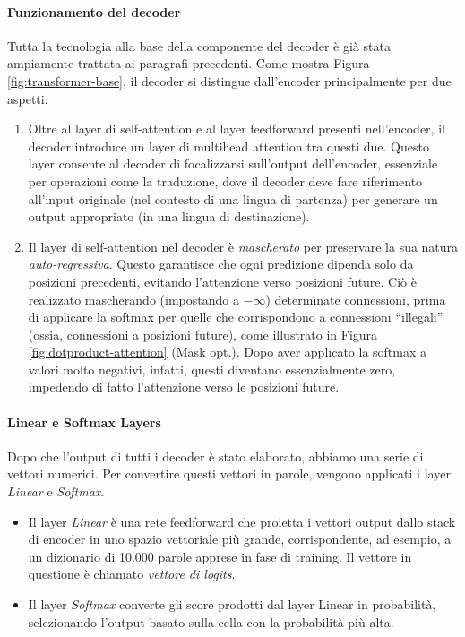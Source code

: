 \documentclass[12pt,a4paper,twoside,openright]{book}
\begin{document}
\paragraph{Funzionamento del decoder}
Tutta la tecnologia alla base della componente del decoder è già stata ampiamente trattata ai paragrafi precedenti. 
Come mostra Figura \ref{fig:transformer-base}, il decoder si distingue dall'encoder principalmente per due aspetti:
\begin{enumerate}
    \item Oltre al layer di self-attention e al layer feedforward presenti nell'encoder, il decoder introduce un layer di multihead attention tra questi due. Questo layer consente al decoder di focalizzarsi sull'output dell'encoder, essenziale per operazioni come la traduzione, dove il decoder deve fare riferimento all'input originale (nel contesto di una lingua di partenza) per generare un output appropriato (in una lingua di destinazione).
    
    \item Il layer di self-attention nel decoder è \emph{mascherato} per preservare la sua natura \emph{auto-regressiva}. Questo garantisce che ogni predizione dipenda solo da posizioni precedenti, evitando l'attenzione verso posizioni future. Ciò è realizzato mascherando (impostando a $-\infty$) determinate connessioni, prima di applicare la softmax per quelle che corrispondono a connessioni ``illegali'' (ossia, connessioni a posizioni future), come illustrato in Figura \ref{fig:dotproduct-attention} (Mask opt.). Dopo aver applicato la softmax a valori molto negativi, infatti, questi diventano essenzialmente zero, impedendo di fatto l'attenzione verso le posizioni future.
\end{enumerate}



\paragraph{Linear e Softmax Layers}
Dopo che l'output di tutti i decoder è stato elaborato, abbiamo una serie di vettori numerici. Per convertire questi vettori in parole, vengono applicati i layer \emph{Linear} e \emph{Softmax}. 
\begin{itemize}
    \item Il layer \emph{Linear} è una rete feedforward che proietta i vettori output dallo stack di encoder in uno spazio vettoriale più grande, corrispondente, ad esempio, a un dizionario di 10.000 parole apprese in fase di training. Il vettore in questione è chiamato \emph{vettore di logits}.
    \item Il layer \emph{Softmax} converte gli score prodotti dal layer Linear in probabilità, selezionando l'output basato sulla cella con la probabilità più alta.
\end{itemize}
\end{document}
